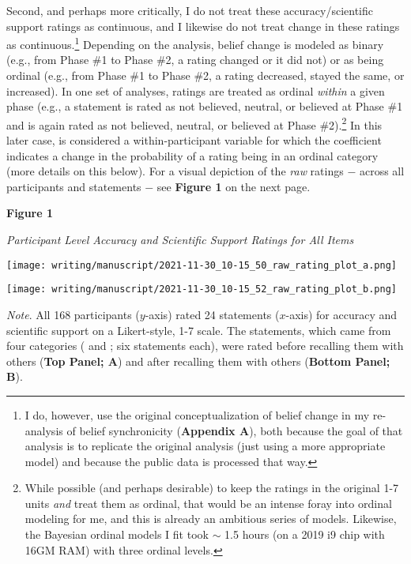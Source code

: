 \documentclass[12pt]{article}  %
\begin{document}
Second, and perhaps more critically, I do not treat these accuracy/scientific support ratings as continuous, and I likewise do not treat change in these ratings as continuous.\footnote{I do, however, use the original conceptualization of belief change in my re-analysis of belief synchronicity (\textbf{Appendix A}), both because the goal of that analysis is to replicate the original analysis (just using a more appropriate model) and because the public data is processed that way.} Depending on the analysis, belief change is modeled as binary (e.g., from Phase \#1 to Phase \#2, a rating changed or it did not) or as being ordinal (e.g., from Phase \#1 to Phase \#2, a rating decreased, stayed the same, or increased). In one set of analyses, ratings are treated as ordinal \textit{within} a given phase (e.g., a statement is rated as not believed, neutral, or believed at Phase \#1 and is again rated as not believed, neutral, or believed at Phase \#2).\footnote{While possible (and perhaps desirable) to keep the ratings in the original 1-7 units \textit{and} treat them as ordinal, that would be an intense foray into ordinal modeling for me, and this is already an ambitious series of models. Likewise, the Bayesian ordinal models I fit took $\sim$ 1.5 hours (on a 2019 i9 chip with 16GM RAM) with three ordinal levels.} In this later case,  is considered a within-participant variable for which the coefficient indicates a change in the probability of a rating being in an ordinal category (more details on this below). For a visual depiction of the \textit{raw} ratings $-$ across all participants and statements $-$ see \textbf{Figure 1} on the next page.


\newpage

\textbf{Figure 1}

\textit{Participant Level Accuracy and Scientific Support Ratings for All Items}

\vspace{0.5cm}

\hspace{-1.5cm}\texttt{[image: writing/manuscript/2021-11-30\_10-15\_50\_raw\_rating\_plot\_a.png]}

\hspace{-1.5cm}\texttt{[image: writing/manuscript/2021-11-30\_10-15\_52\_raw\_rating\_plot\_b.png]}

\singlespacing
\noindent\textit{Note}. All 168 participants ($y$-axis) rated 24 statements ($x$-axis) for accuracy and scientific support on a Likert-style, 1-7 scale. The statements, which came from four categories (   and ; six statements each), were rated before recalling them with others (\textbf{Top Panel; A}) and after recalling them with others (\textbf{Bottom Panel; B}).
\newpage
\end{document}
